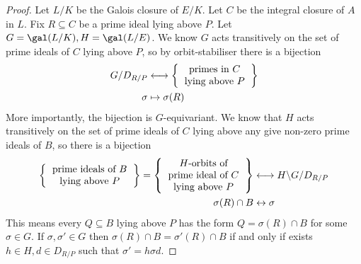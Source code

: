 \documentclass[a4paper]{article}
\begin{document}
\begin{proof}
  Let \(L/K\) be the Galois closure of \(E/K\). Let \(C\) be the integral closure of \(A\) in \(L\). Fix \(R \subseteq C\) be a prime ideal lying above \(P\). Let \(G = \gal(L/K), H = \gal(L/E)\). We know \(G\) acts transitively on the set of prime ideals of \(C\) lying above \(P\), so by orbit-stabiliser there is a bijection
  \begin{align*}
    G/D_{R/P} &\longleftrightarrow
                \left\{
                \begin{tabular}{c}
                  primes in \(C\) \\
                  lying above \(P\)
                \end{tabular}
    \right\}
    \\
    \sigma &\mapsto \sigma(R)
  \end{align*}
  More importantly, the bijection is \(G\)-equivariant. We know that \(H\) acts transitively on the set of prime ideals of \(C\) lying above any give non-zero prime ideals of \(B\), so there is a bijection
  \begin{align*}
    \left\{
    \begin{tabular}{c}
      prime ideals of \(B\) \\
      lying above \(P\)
    \end{tabular}
    \right\}
    =
      \left\{
      \begin{tabular}{c}
        \(H\)-orbits of \\
        prime ideal of \(C\) \\
        lying above \(P\)
      \end{tabular}
    \right\}
    &\longleftrightarrow
      H \backslash G /D_{R/P} \\
    \sigma(R) \cap B &\leftrightarrow \sigma
  \end{align*}
  This means every \(Q \subseteq B\) lying above \(P\) has the form \(Q = \sigma(R) \cap B\) for some \(\sigma \in G\). If \(\sigma, \sigma' \in G\) then \(\sigma(R) \cap B = \sigma'(R) \cap B\) if and only if exists \(h \in H, d \in D_{R/P}\) such that \(\sigma' = h\sigma d\).


\end{proof}
\end{document}
